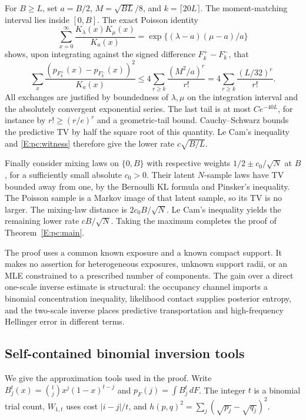 \documentclass[11pt,a4paper]{article}
\theoremstyle{definition}
\theoremstyle{remark}
\numberwithin{equation}{section}
\begin{document}
For $B\ge L$, set $a=B/2$, $M=\sqrt{BL}/8$, and
$k=\lceil20L\rceil$.  The moment-matching interval lies inside
$[0,B]$.  The exact Poisson identity
\[
 \sum_{x=0}^\infty\frac{K_\lambda(x)K_\mu(x)}{K_a(x)}
                   =\exp\{(\lambda-a)(\mu-a)/a\}
\]
shows, upon integrating against the signed difference $F_k^+-F_k^-$,
that
\[
 \sum_x\frac{(p_{F_k^+}(x)-p_{F_k^-}(x))^2}{K_a(x)}
 \le4\sum_{r\ge k}\frac{(M^2/a)^r}{r!}
 =4\sum_{r\ge k}\frac{(L/32)^r}{r!}.
\]
All exchanges are justified by boundedness of $\lambda,\mu$ on
the integration interval and the absolutely convergent exponential
series.  The last tail is at most $Ce^{-40L}$, for instance by
$r!\ge(r/e)^r$ and a geometric-tail bound.  Cauchy--Schwarz bounds
the predictive TV by half the square root of this quantity.
Le Cam's inequality and \eqref{E:pc:witness} therefore give the
lower rate $c\sqrt{B/L}$.

Finally consider mixing laws on $\{0,B\}$ with respective weights
$1/2\pm c_0/\sqrt N$ at $B$, for a sufficiently small absolute
$c_0>0$.  Their latent $N$-sample laws have TV bounded away from
one, by the Bernoulli KL formula and Pinsker's inequality.  The
Poisson sample is a Markov image of that latent sample, so its TV
is no larger.  The mixing-law distance is $2c_0B/\sqrt N$.
Le Cam's inequality yields the remaining lower rate $cB/\sqrt N$.
Taking the maximum completes the proof of Theorem~\ref{E:pc:main}.

The proof uses a common known exposure and a known compact support.
It makes no assertion for heterogeneous exposures, unknown support
radii, or an MLE constrained to a prescribed number of components.
The gain over a direct one-scale inverse estimate is structural:
the occupancy channel imports a binomial concentration inequality,
likelihood contact supplies posterior entropy, and the two-scale
inverse places predictive transportation and high-frequency
Hellinger error in different terms.

\subsection{Self-contained binomial inversion tools}
\label{E:pc:binomialtools}

We give the approximation tools used in the proof. Write
$B_j^t(x)=\binom tjx^j(1-x)^{t-j}$ and
$p_F(j)=\int B_j^t\,dF$. The integer $t$ is a binomial trial count,
$W_{1,t}$ uses cost $|i-j|/t$, and
$h(p,q)^2=\sum_j(\sqrt{p_j}-\sqrt{q_j})^2$.
\end{document}
